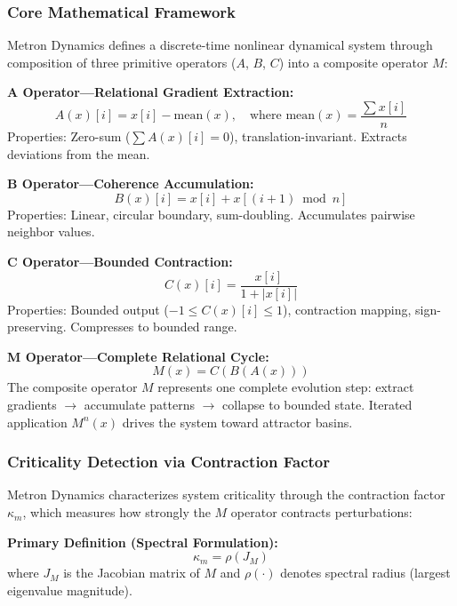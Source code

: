 \documentclass[11pt]{article}
\begin{document}
\subsubsection{Core Mathematical Framework}

Metron Dynamics defines a discrete-time nonlinear dynamical system through composition of three primitive operators ($A$, $B$, $C$) into a composite operator $M$:

\textbf{A Operator---Relational Gradient Extraction:}
\begin{equation}
A(x)[i] = x[i] - \text{mean}(x), \quad \text{where } \text{mean}(x) = \frac{\sum x[i]}{n}
\end{equation}
Properties: Zero-sum ($\sum A(x)[i] = 0$), translation-invariant. Extracts deviations from the mean.

\textbf{B Operator---Coherence Accumulation:}
\begin{equation}
B(x)[i] = x[i] + x[(i+1) \bmod n]
\end{equation}
Properties: Linear, circular boundary, sum-doubling. Accumulates pairwise neighbor values.

\textbf{C Operator---Bounded Contraction:}
\begin{equation}
C(x)[i] = \frac{x[i]}{1 + |x[i]|}
\end{equation}
Properties: Bounded output ($-1 \leq C(x)[i] \leq 1$), contraction mapping, sign-preserving. Compresses to bounded range.

\textbf{M Operator---Complete Relational Cycle:}
\begin{equation}
M(x) = C(B(A(x)))
\end{equation}
The composite operator $M$ represents one complete evolution step: extract gradients $\to$ accumulate patterns $\to$ collapse to bounded state. Iterated application $M^n(x)$ drives the system toward attractor basins.

\subsubsection{Criticality Detection via Contraction Factor}

Metron Dynamics characterizes system criticality through the contraction factor $\kappa_m$, which measures how strongly the $M$ operator contracts perturbations:

\textbf{Primary Definition (Spectral Formulation):}
\begin{equation}
\kappa_m = \rho(J_M)
\end{equation}
where $J_M$ is the Jacobian matrix of $M$ and $\rho(\cdot)$ denotes spectral radius (largest eigenvalue magnitude).
\end{document}
